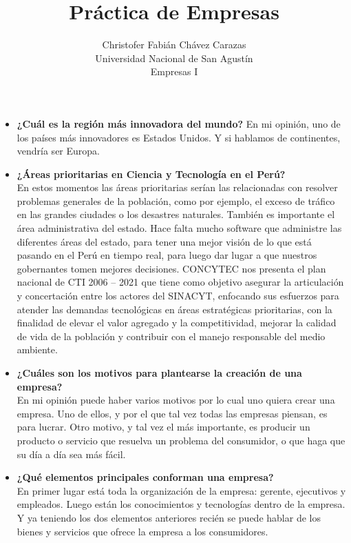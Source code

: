 \documentclass[a4paper,12pt]{article}
\begin{document}
\title{Práctica de Empresas}
  \author{
  Christofer Fabián Chávez Carazas \\
  \small{Universidad Nacional de San Agustín} \\
  \small{Empresas I}
}
\date{}

\maketitle


\begin{itemize}
 \item \textbf{¿Cuál es la región más innovadora del mundo?}
 En mi opinión, uno de los países más innovadores es Estados Unidos. Y si hablamos de continentes, vendría ser Europa.
 
 \item \textbf{¿Áreas prioritarias en Ciencia y Tecnología en el Perú?} \\
 En estos momentos las áreas prioritarias serían las relacionadas con resolver problemas generales de la población,
 como por ejemplo, el exceso de tráfico en las grandes ciudades o los desastres naturales. También es importante el área
 administrativa del estado. Hace falta mucho software que administre las diferentes áreas del estado, para tener una mejor
 visión de lo que está pasando en el Perú en tiempo real, para luego dar lugar a que nuestros gobernantes tomen mejores decisiones.
 CONCYTEC nos presenta el plan nacional  de CTI 2006 – 2021 que tiene como objetivo asegurar la articulación y concertación entre los
 actores del SINACYT, enfocando sus esfuerzos para atender las demandas tecnológicas en áreas estratégicas prioritarias, con la finalidad de 
 elevar el valor agregado y la competitividad, mejorar la calidad de vida de la población y contribuir con el manejo responsable del medio ambiente.
 
 \item \textbf{¿Cuáles son los motivos para plantearse la creación de una empresa?} \\
 En mi opinión puede haber varios motivos por lo cual uno quiera crear una empresa. Uno de ellos, y por el que tal vez todas las
 empresas piensan, es para lucrar. Otro motivo, y tal vez el más importante, es producir un producto o servicio que resuelva 
 un problema del consumidor, o que haga que su día a día sea más fácil.
 
 \item \textbf{¿Qué elementos principales conforman una empresa?} \\
 En primer lugar está toda la organización de la empresa: gerente, ejecutivos y empleados. Luego están los conocimientos
 y tecnologías dentro de la empresa. Y ya teniendo los dos elementos anteriores recién se puede hablar de los bienes y servicios que ofrece la empresa a los
 consumidores.
 

\end{itemize}
\end{document}
